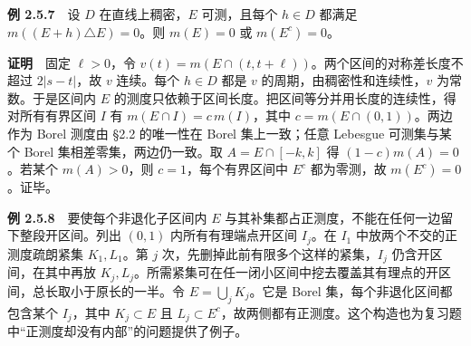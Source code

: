 \documentclass[11pt,a4paper]{article}
\begin{document}
\textbf{例 2.5.7}　设 \(D\) 在直线上稠密，\(E\) 可测，且每个 \(h\in D\) 都满足 \(m((E+h)\triangle E)=0\)。则 \(m(E)=0\) 或 \(m(E^c)=0\)。

\textbf{证明}　固定 \(\ell>0\)，令 \(v(t)=m(E\cap(t,t+\ell))\)。两个区间的对称差长度不超过 \(2|s-t|\)，故 \(v\) 连续。每个 \(h\in D\) 都是 \(v\) 的周期，由稠密性和连续性，\(v\) 为常数。于是区间内 \(E\) 的测度只依赖于区间长度。把区间等分并用长度的连续性，得对所有有界区间 \(I\) 有 \(m(E\cap I)=c\,m(I)\)，其中 \(c=m(E\cap(0,1))\)。两边作为 Borel 测度由 \S{}2.2 的唯一性在 Borel 集上一致；任意 Lebesgue 可测集与某个 Borel 集相差零集，两边仍一致。取 \(A=E\cap[-k,k]\) 得 \((1-c)m(A)=0\)。若某个 \(m(A)>0\)，则 \(c=1\)，每个有界区间中 \(E^c\) 都为零测，故 \(m(E^c)=0\)。证毕。

\textbf{例 2.5.8}　要使每个非退化子区间内 \(E\) 与其补集都占正测度，不能在任何一边留下整段开区间。列出 \((0,1)\) 内所有有理端点开区间 \(I_j\)。在 \(I_1\) 中放两个不交的正测度疏朗紧集 \(K_1,L_1\)。第 \(j\) 次，先删掉此前有限多个这样的紧集，\(I_j\) 仍含开区间，在其中再放 \(K_j,L_j\)。所需紧集可在任一闭小区间中挖去覆盖其有理点的开区间，总长取小于原长的一半。令 \(E=\bigcup_j K_j\)。它是 Borel 集，每个非退化区间都包含某个 \(I_j\)，其中 \(K_j\subset E\) 且 \(L_j\subset E^c\)，故两侧都有正测度。这个构造也为复习题中``正测度却没有内部''的问题提供了例子。
\end{document}
